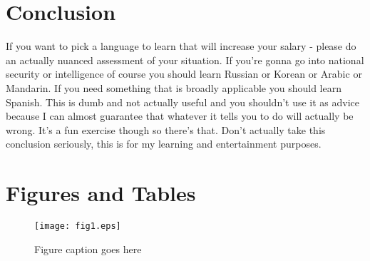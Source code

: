 \documentclass[12pt,english]{article}
\begin{document}
\section{Conclusion}\label{sec:conclusion}
If you want to pick a language to learn that will increase your salary - please do an actually nuanced assessment of your situation. If you're gonna go into national security or intelligence of course you should learn Russian or Korean or Arabic or Mandarin. If you need something that is broadly applicable you should learn Spanish. This is dumb and not actually useful and you shouldn't use it as advice because I can almost guarantee that whatever it tells you to do will actually be wrong. It's a fun exercise though so there's that. Don't actually take this conclusion seriously, this is for my learning and entertainment purposes. 

\vfill
\pagebreak{}
\begin{spacing}{1.0}


\end{spacing}

\vfill
\pagebreak{}
\clearpage

\section*{Figures and Tables}\label{sec:figTables}
\begin{figure}[ht]
\centering
\bigskip{}
\texttt{[image: fig1.eps]}
\caption{Figure caption goes here}
\label{fig:fig1}
\end{figure}
\end{document}

